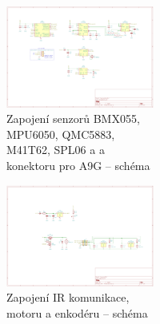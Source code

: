 \begin{figure}
\begin{figure}
\begin{figure}
\begin{figure}[htbp]
    \includegraphics[width=0.93\textheight, angle=90]{kapitoly/ctvrta_elektronicka_varianta/E4_zapojeni/senzorika.pdf}
    \caption{Zapojení senzorů BMX055, MPU6050, QMC5883, M41T62, SPL06 a a konektoru pro A9G -- schéma \centering}
    \label{fig:E4-sch_senzorika}
\end{figure}
\begin{figure}[htbp]
    \centering
    \includegraphics[width=0.93\textheight, angle=90]{kapitoly/ctvrta_elektronicka_varianta/E4_zapojeni/IR_motor_enkoder.pdf}
    \caption{Zapojení IR komunikace, motoru a enkodéru -- schéma}
    \label{fig:E4-sch_IR-Motor-enkoder}
\end{figure}
\begin{figure}[htbp]
    \centering

\end{figure}
\end{figure}
\end{figure}
\end{figure}
